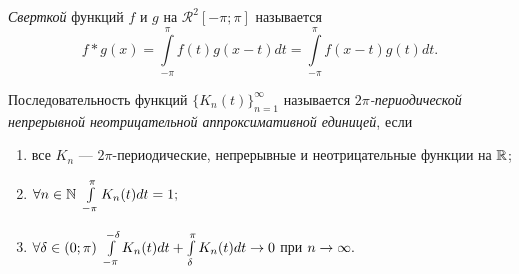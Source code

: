 \begin{Def}
    \textit{Сверткой} функций $f$ и $g$ на $\mathcal{R}^2[-\pi;\pi]$ называется
	$$
    f*g(x) = \int\limits_{-\pi}^{\pi} f(t)g(x-t)dt = \int\limits_{-\pi}^{\pi}f(x-t)g(t)dt.
    $$
\end{Def}

\begin{Def}
    Последовательность функций $\{K_n(t)\}_{n=1}^\infty$ называется  \textit{ $2\pi$-периодической непрерывной неотрицательной аппроксимативной единицей}, если
    \begin{enumerate}
        \item все $K_n$ --- $2\pi$-периодические, непрерывные и неотрицательные функции на $\mathbb{R}$;
        \item $\forall n \in \mathbb{N}\  \int\limits_{-\pi}^{\pi} K_n(t)dt = 1;$        \item $\forall \delta \in (0; \pi)\  \int\limits_{-\pi}^{-\delta} K_n(t)dt + \int\limits_{\delta}^{\pi} K_n(t)dt\rightarrow 0$ при $n \rightarrow \infty.$
    \end{enumerate}
\end{Def}

